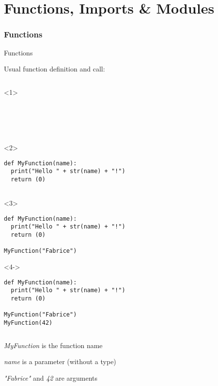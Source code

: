 
\part{Functions, Imports \& Modules}  %


\section{Functions}

\begin{frame}[fragile]{Functions}

  Usual function definition and call:

  \begin{columns}[onlytextwidth]
    \begin{column}{\textwidth}

      \begin{onlyenv}<1>
        \begin{lstlisting}[style=python]





 \end{lstlisting}
      \end{onlyenv}

      \begin{onlyenv}<2>
        \begin{lstlisting}[style=python]
def MyFunction(name):
  print("Hello " + str(name) + "!")
  return (0)


 \end{lstlisting}
      \end{onlyenv}

      \begin{onlyenv}<3>
        \begin{lstlisting}[style=python]
def MyFunction(name):
  print("Hello " + str(name) + "!")
  return (0)

MyFunction("Fabrice")
 \end{lstlisting}
      \end{onlyenv}

      \begin{onlyenv}<4->
        \begin{lstlisting}[style=python]
def MyFunction(name):
  print("Hello " + str(name) + "!")
  return (0)

MyFunction("Fabrice")
MyFunction(42) \end{lstlisting}
      \end{onlyenv}

    \end{column}
  \end{columns}

   \textit{MyFunction} is the function name

   \textit{name} is a parameter (without a type)

   \textit{"Fabrice"} and \textit{42} are arguments

\end{frame}


